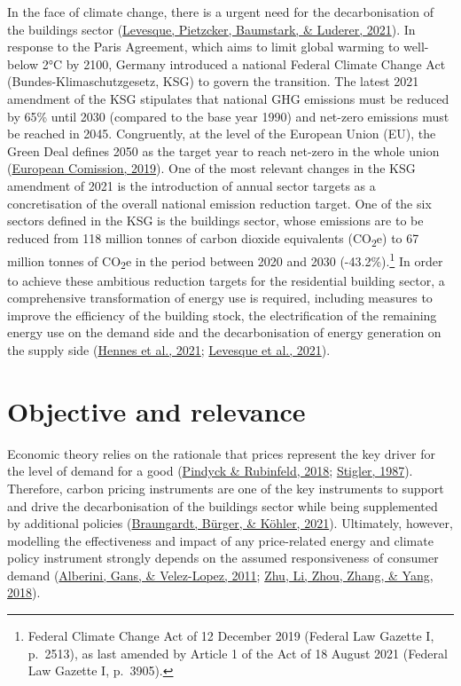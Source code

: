 \documentclass[12pt,twoside]{reedthesis}
\begin{document}
In the face of climate change, there is a urgent need for the decarbonisation of the buildings sector (\protect\hyperlink{ref-levesque_etal21}{Levesque, Pietzcker, Baumstark, \& Luderer, 2021}). In response to the Paris Agreement, which aims to limit global warming to well-below 2°C by 2100, Germany introduced a national Federal Climate Change Act (Bundes-Klimaschutzgesetz, KSG) to govern the transition. The latest 2021 amendment of the KSG stipulates that national GHG emissions must be reduced by 65\% until 2030 (compared to the base year 1990) and net-zero emissions must be reached in 2045. Congruently, at the level of the European Union (EU), the Green Deal defines 2050 as the target year to reach net-zero in the whole union (\protect\hyperlink{ref-europeancomission19}{European Comission, 2019}). One of the most relevant changes in the KSG amendment of 2021 is the introduction of annual sector targets as a concretisation of the overall national emission reduction target. One of the six sectors defined in the KSG is the buildings sector, whose emissions are to be reduced from 118 million tonnes of carbon dioxide equivalents (CO\textsubscript{2}e) to 67 million tonnes of CO\textsubscript{2}e in the period between 2020 and 2030 (-43.2\%).\footnote{Federal Climate Change Act of 12 December 2019 (Federal Law Gazette I, p.~2513), as last amended by Article 1 of the Act of 18 August 2021 (Federal Law Gazette I, p.~3905).} In order to achieve these ambitious reduction targets for the residential building sector, a comprehensive transformation of energy use is required, including measures to improve the efficiency of the building stock, the electrification of the remaining energy use on the demand side and the decarbonisation of energy generation on the supply side (\protect\hyperlink{ref-hennes_etal21}{Hennes et al., 2021}; \protect\hyperlink{ref-levesque_etal21}{Levesque et al., 2021}).

\hypertarget{relevance}{%
\section{Objective and relevance}\label{relevance}}

Economic theory relies on the rationale that prices represent the key driver for the level of demand for a good (\protect\hyperlink{ref-pindyck_rubinfeld18}{Pindyck \& Rubinfeld, 2018}; \protect\hyperlink{ref-stigler87}{Stigler, 1987}). Therefore, carbon pricing instruments are one of the key instruments to support and drive the decarbonisation of the buildings sector while being supplemented by additional policies (\protect\hyperlink{ref-braungardt_etal21}{Braungardt, Bürger, \& Köhler, 2021}). Ultimately, however, modelling the effectiveness and impact of any price-related energy and climate policy instrument strongly depends on the assumed responsiveness of consumer demand (\protect\hyperlink{ref-alberini_etal11}{Alberini, Gans, \& Velez-Lopez, 2011}; \protect\hyperlink{ref-zhu_etal18}{Zhu, Li, Zhou, Zhang, \& Yang, 2018}).
\end{document}
